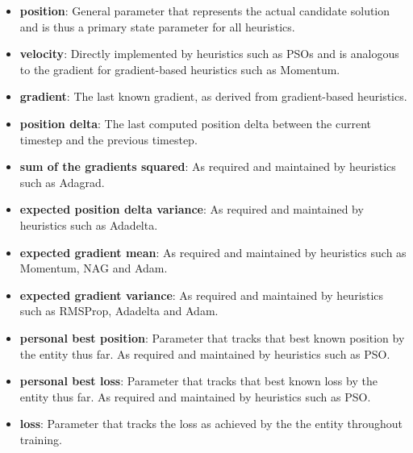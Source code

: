 \begin{itemize}
      \item \textbf{position}: General parameter that represents the actual candidate solution and is thus a primary state parameter for all heuristics.

      \item \textbf{velocity}: Directly implemented by heuristics such as \acp{PSO} and is analogous to the gradient for gradient-based heuristics such as \ac{Momentum}.

      \item \textbf{gradient}: The last known gradient, as derived from gradient-based heuristics.

      \item \textbf{position delta}: The last computed position delta between the current timestep and the previous timestep.

      \item \textbf{sum of the gradients squared}: As required and maintained by heuristics such as \acs{Adagrad}.

      \item \textbf{expected position delta variance}: As required and maintained by heuristics such as \acs{Adadelta}.

      \item \textbf{expected gradient mean}: As required and maintained by heuristics such as \acs{Momentum}, \acs{NAG} and \acs{Adam}.

      \item \textbf{expected gradient variance}: As required and maintained by heuristics such as \acs{RMSProp}, \acs{Adadelta} and \acs{Adam}.

      \item \textbf{personal best position}: Parameter that tracks that best known position by the entity thus far. As required and maintained by heuristics such as \acs{PSO}.

      \item \textbf{personal best loss}: Parameter that tracks that best known loss by the entity thus far. As required and maintained by heuristics such as \acs{PSO}.

      \item \textbf{loss}: Parameter that tracks the loss as achieved by the the entity throughout training.
\end{itemize}

